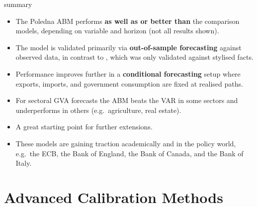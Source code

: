 \documentclass[9pt]{beamer}
\begin{document}
\begin{frame}{\cite{poledna_economic_2019} summary}
    \begin{itemize}
        \item The Poledna ABM performs \textbf{as well as or better than} the comparison models, depending on variable and horizon (not all results shown).
        \item The model is validated primarily via \textbf{out-of-sample forecasting} against observed data, in contrast to \cite{assenza_emergent_2015}, which was only validated against stylised facts.
        \item Performance improves further in a \textbf{conditional forecasting} setup where exports, imports, and government consumption are fixed at realised paths.
        \item For sectoral GVA forecasts the ABM beats the VAR in some sectors and underperforms in others (e.g.\ agriculture, real estate).
        \item A great starting point for further extensions.
        \item These models are gaining traction academically and in the policy world, e.g.\ the ECB, the Bank of England, the Bank of Canada, and the Bank of Italy.
    \end{itemize}
\end{frame}

\section{Advanced Calibration Methods}
\end{document}
